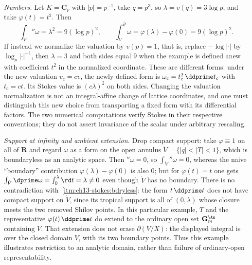 \begin{example}
\emph{Numbers.}  Let $K=\mathbf C_p$ with $|p|=p^{-1}$, take $q=p^{3}$, so
$\lambda=v(q)=3\log p$, and take $\varphi(t)=t^2$.  Then
\[
 \int_V\dprime\omega=\lambda^2=9(\log p)^2,
 \qquad
 \int_V^{\partial}\omega=\varphi(\lambda)-\varphi(0)=9(\log p)^2 .
\]
If instead we normalize the valuation by $v(p)=1$, that is, replace
$-\log|\cdot|$ by $\log_p|\cdot|^{-1}$, then $\lambda=3$ and both sides
equal $9$ when the example is defined anew with coefficient $t^2$ in
the normalized coordinate.  These are different forms: under the new
valuation $v_c=cv$, the newly defined form is
$\omega_c=t_c^2\,\ddprime t_c$ with $t_c=ct$.
Its Stokes value is $(c\lambda)^2$ on both sides.  Changing the valuation
normalization is not an integral-affine change of lattice coordinates,
and one must distinguish this new choice from transporting a fixed
form with its differential factors.  The two numerical computations
verify Stokes in their respective conventions; they do not assert
invariance of the scalar under arbitrary rescaling.

\emph{Support at infinity and ambient extension.}  Drop compact support:
take $\varphi\equiv1$ on
all of $\mathbf R$ and regard $\omega$ as a form on the open annulus
$\mathring V=\{|q|<|T|<1\}$, which is boundaryless as an analytic space.
Then $\dprime\omega=0$, so $\int_{\mathring V}\dprime\omega=0$, whereas the
naive ``boundary'' contribution $\varphi(\lambda)-\varphi(0)$ is also $0$;
but for $\varphi(t)=t$ one gets $\int_{\mathring V}\dprime\omega
=\int_0^\lambda\rd t=\lambda\ne0$ even though $\mathring V$ has no boundary.
There is no contradiction with
\,\cref{itm:ch13-stokes:bdryless}: the form
$t\,\ddprime t$ does not have compact support on $\mathring V$, since its
tropical support is all of $(0,\lambda)$ whose closure meets the two removed
Shilov points.  In this particular example, $T$ and the representative
$\varphi(t)\,\ddprime t$ do extend to the ordinary open set
$\mathbf G_m^{\An}$ containing $V$.  That extension does not erase
$\partial(V/X)$: the displayed integral is over the closed domain $V$,
with its two boundary points.  Thus this example illustrates restriction
to an analytic domain, rather than failure of ordinary-open
representability.
\end{example}

